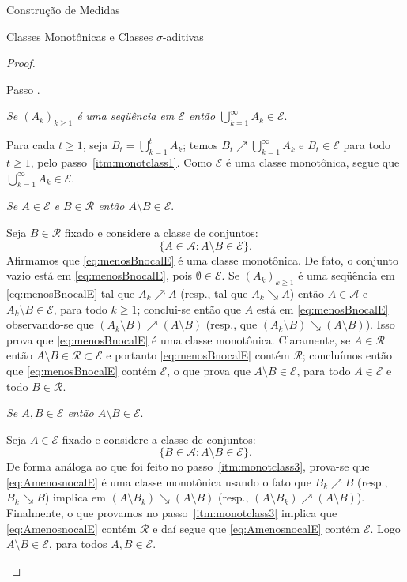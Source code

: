 \documentclass[oneside,final,11pt]{amsbook}
\newcounter{contastep}
\newenvironment{stepindent}{\setcounter{contastep}{1}
\begin{list} {Passo \arabic{contastep}.}
{\usecounter{contastep}
\setlength{\leftmargin}{10pt}
\setlength{\rightmargin}{10pt}
\setlength{\labelsep}{5pt}
\setlength{\itemsep}{10pt}
\setlength{\topsep}{10pt}}}
{\end{list}}
\theoremstyle{remark}\newtheorem{exercise}{Exercício}[chapter]
\theoremstyle{remark}\newtheorem{*exercise}[exercise]{\hbox to 0pt{\hskip 0pt minus 1fil*}Exercício}
\theoremstyle{definition}\newtheorem{exdefin}{Definição}[chapter]
\theoremstyle{plain}\newtheorem{teo}{Teorema}[section]
\theoremstyle{plain}\newtheorem{lem}[teo]{Lema}
\theoremstyle{plain}\newtheorem{prop}[teo]{Proposição}
\theoremstyle{plain}\newtheorem{cor}[teo]{Corolário}
\theoremstyle{definition}\newtheorem{defin}[teo]{Definição}
\theoremstyle{remark}\newtheorem{rem}[teo]{Observação}
\theoremstyle{definition}\newtheorem{notation}[teo]{Notação}
\theoremstyle{definition}\newtheorem{convention}[teo]{Convenção}
\theoremstyle{definition}\newtheorem{example}[teo]{Exemplo}
\numberwithin{section}{chapter}
\numberwithin{equation}{section}
\begin{document}
\begin{chapter}{Construção de Medidas}
\begin{section}{Classes Monotônicas e Classes ${\sigma}$-aditivas}
\begin{proof}
\begin{stepindent}
\item {\em Se $(A_k)_{k\ge1}$ é uma seqüência em $\mathcal E$ então $\bigcup_{k=1}^\infty A_k\in\mathcal E$}.

Para cada $t\ge1$, seja $B_t=\bigcup_{k=1}^tA_k$; temos $B_t\nearrow\bigcup_{k=1}^\infty A_k$ e $B_t\in\mathcal E$
para todo $t\ge1$, pelo passo~\ref{itm:monotclass1}. Como $\mathcal E$ é uma classe monotônica, segue que
$\bigcup_{k=1}^\infty A_k\in\mathcal E$.

\item\label{itm:monotclass3}
{\em Se $A\in\mathcal E$ e $B\in\mathcal R$ então $A\setminus B\in\mathcal E$}.

Seja $B\in\mathcal R$ fixado e considere a classe de conjuntos:
\begin{equation}\label{eq:menosBnocalE}
\big\{A\in\mathcal A:A\setminus B\in\mathcal E\big\}.
\end{equation}
Afirmamos que \eqref{eq:menosBnocalE} é uma classe monotônica. De fato, o conjunto vazio está em \eqref{eq:menosBnocalE},
pois $\emptyset\in\mathcal E$. Se $(A_k)_{k\ge1}$ é uma seqüência em \eqref{eq:menosBnocalE} tal que
$A_k\nearrow A$ (resp., tal que $A_k\searrow A$) então $A\in\mathcal A$ e $A_k\setminus B\in\mathcal E$, para todo $k\ge1$;
conclui-se então que $A$ está em \eqref{eq:menosBnocalE} observando-se que $(A_k\setminus B)\nearrow(A\setminus B)$
(resp., que $(A_k\setminus B)\searrow(A\setminus B)$). Isso prova que \eqref{eq:menosBnocalE} é uma
classe monotônica. Claramente, se $A\in\mathcal R$ então
$A\setminus B\in\mathcal R\subset\mathcal E$ e portanto \eqref{eq:menosBnocalE} contém $\mathcal R$;
concluímos então que \eqref{eq:menosBnocalE} contém $\mathcal E$, o que prova que $A\setminus B\in\mathcal E$,
para todo $A\in\mathcal E$ e todo $B\in\mathcal R$.

\item {\em Se $A,B\in\mathcal E$ então $A\setminus B\in\mathcal E$}.

Seja $A\in\mathcal E$ fixado e considere a classe de conjuntos:
\begin{equation}\label{eq:AmenosnocalE}
\big\{B\in\mathcal A:A\setminus B\in\mathcal E\big\}.
\end{equation}
De forma análoga ao que foi feito no passo~\ref{itm:monotclass3}, prova-se que \eqref{eq:AmenosnocalE}
é uma classe monotônica usando o fato que $B_k\nearrow B$ (resp., $B_k\searrow B$) implica
em $(A\setminus B_k)\searrow(A\setminus B)$ (resp., $(A\setminus B_k)\nearrow(A\setminus B)$).
Finalmente, o que provamos no passo~\ref{itm:monotclass3} implica que \eqref{eq:AmenosnocalE} contém
$\mathcal R$ e daí segue que \eqref{eq:AmenosnocalE} contém $\mathcal E$. Logo $A\setminus B\in\mathcal E$,
para todos $A,B\in\mathcal E$.\qedhere
\end{stepindent}
\end{proof}


\end{section}
\end{chapter}
\end{document}
